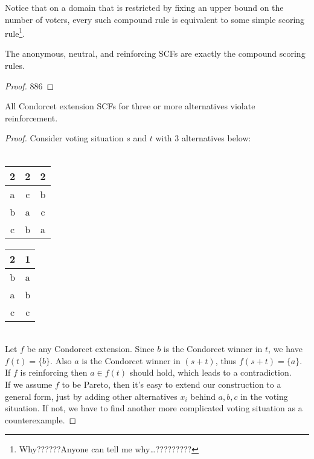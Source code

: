 Notice that on a domain that is restricted by fixing an upper bound on the number of voters, every such compound rule is equivalent to some simple scoring rule\footnote{Why??????Anyone can tell me why\dots?????????}.

\begin{theorem}
    The anonymous, neutral, and reinforcing SCFs are exactly the compound scoring rules.
\end{theorem}

\begin{proof}
    886
\end{proof}

\begin{proposition}
    \label{not_reinforcing}
    All Condorcet extension SCFs for three or more alternatives violate reinforcement.
\end{proposition}

\begin{proof}
    Consider voting situation $s$ and $t$ with 3 alternatives below:\\
    ~\\
    \begin{minipage}{0.5\textwidth}
        \begin{center}
            \begin{tabular}{ccc}
                2 & 2 & 2\\
                \hline
                a & c & b\\
                b & a & c\\
                c & b & a
            \end{tabular}
        \end{center}
    \end{minipage}
    \begin{minipage}{0.4\textwidth}
            \begin{tabular}{cc}
                2 & 1\\
                \hline
                b & a \\
                a & b\\
                c & c
            \end{tabular}
    \end{minipage}
    \\
    Let $f$ be any Condorcet extension. Since $b$ is the Condorcet winner in $t$, we have $f(t) = \{b\}$. Also $a$ is the Condorcet winner in $(s+t)$, thus $f(s+t) = \{a\}$. If $f$ is reinforcing then $a \in f(t)$ should hold, which leads to a contradiction.\\
    If we assume $f$ to be Pareto, then it's easy to extend our construction to a general form, just by adding other alternatives $x_i$ behind $a,b,c$ in the voting situation. If not, we have to find another more complicated voting situation as a counterexample.
\end{proof}

